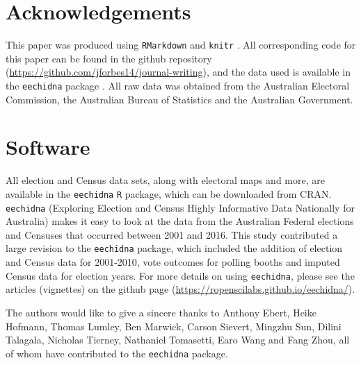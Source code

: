 \documentclass[openany]{book}
\begin{document}
\hypertarget{acknowledgements}{%
\chapter{Acknowledgements}\label{acknowledgements}}

This paper was produced using \texttt{RMarkdown}\citep{rmarkdown} and \texttt{knitr} \citep{knitr}. All corresponding code for this paper can be found in the github repository (\url{https://github.com/jforbes14/journal-writing}), and the data used is available in the \texttt{eechidna} package \citep{eechidna}. All raw data was obtained from the Australian Electoral Commission, the Australian Bureau of Statistics and the Australian Government.

\hypertarget{software}{%
\chapter{Software}\label{software}}

All election and Census data sets, along with electoral maps and more, are available in the \texttt{eechidna} \texttt{R} package, which can be downloaded from CRAN. \texttt{eechidna} (Exploring Election and Census Highly Informative Data Nationally for Australia) makes it easy to look at the data from the Australian Federal elections and Censuses that occurred between 2001 and 2016. This study contributed a large revision to the \texttt{eechidna} package, which included the addition of election and Census data for 2001-2010, vote outcomes for polling booths and imputed Census data for election years. For more details on using \texttt{eechidna}, please see the articles (vignettes) on the github page (\url{https://ropenscilabs.github.io/eechidna/}).

The authors would like to give a sincere thanks to Anthony Ebert, Heike Hofmann, Thomas Lumley, Ben Marwick, Carson Sievert, Mingzhu Sun, Dilini Talagala, Nicholas Tierney, Nathaniel Tomasetti, Earo Wang and Fang Zhou, all of whom have contributed to the \texttt{eechidna} package.


\end{document}
